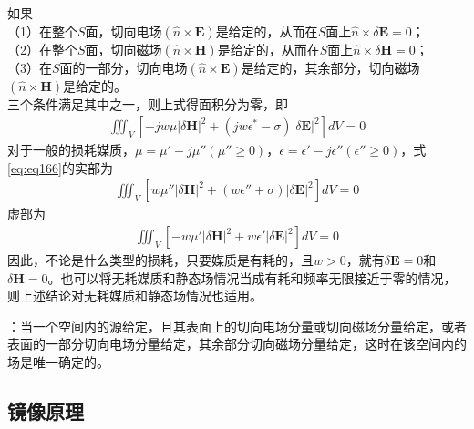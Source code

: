 \documentclass{article}
\numberwithin{equation}{section}
\begin{document}
如果\\
（1）在整个$S$面，切向电场$(\hat{n}\times\mathbf{E})$是给定的，从而在$S$面上$\hat{n}\times\delta\mathbf{E}=0$；\\
（2）在整个$S$面，切向磁场$(\hat{n}\times\mathbf{H})$是给定的，从而在$S$面上$\hat{n}\times\delta\mathbf{H}=0$；\\
（3）在$S$面的一部分，切向电场$(\hat{n}\times\mathbf{E})$是给定的，其余部分，切向磁场$(\hat{n}\times\mathbf{H})$是给定的。\\
三个条件满足其中之一，则上式得面积分为零，即
\begin{align}
    \label{eq:eq166}
    \iiint_V \left[-jw\mu\left|\delta\mathbf{H}\right|^2+(jw\epsilon^*-\sigma)\left|\delta\mathbf{E}\right|^2\right]dV=0
\end{align}
对于一般的损耗媒质，$\mu=\mu'-j\mu''(\mu''\geq 0)$，$\epsilon=\epsilon'-j\epsilon''(\epsilon''\geq 0)$，式\ref{eq:eq166}的实部为
\begin{align}
    \label{eq:eq167}
    \iiint_V \left[w\mu''\left|\delta\mathbf{H}\right|^2+(w\epsilon''+\sigma)\left|\delta\mathbf{E}\right|^2\right]dV=0
\end{align}
虚部为
\begin{align}
    \label{eq:eq168}
    \iiint_V \left[-w\mu'\left|\delta\mathbf{H}\right|^2+w\epsilon'\left|\delta\mathbf{E}\right|^2\right]dV=0
\end{align}
因此，不论是什么类型的损耗，只要媒质是有耗的，且$w>0$，就有$\delta\mathbf{E}=0$和$\delta\mathbf{H}=0$。也可以将无耗媒质和静态场情况当成有耗和频率无限接近于零的情况，则上述结论对无耗媒质和静态场情况也适用。
\par
\textbf{\color{blue}{唯一性定理}}：当一个空间内的源给定，且其表面上的切向电场分量或切向磁场分量给定，或者表面的一部分切向电场分量给定，其余部分切向磁场分量给定，这时在该空间内的场是唯一确定的。
\subsection{镜像原理}
\end{document}
